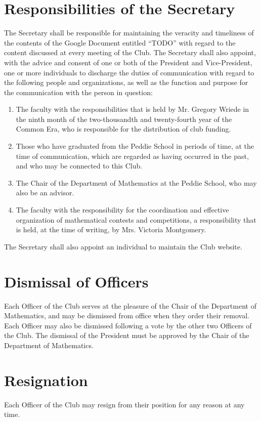 \documentclass[12pt, letterpaper]{article}
\begin{document}
\section{Responsibilities of the Secretary}
The Secretary shall be responsible for maintaining the veracity and timeliness of the contents of the Google Document entitled ``TODO'' with regard to the content discussed at every meeting of the Club. The Secretary shall also appoint, with the advice and consent of one or both of the President and Vice-President, one or more individuals to discharge the duties of communication with regard to the following people and organizations, as well as the function and purpose for the communication with the person in question:
\begin{enumerate}
	\item The faculty with the responsibilities that is held by Mr. Gregory Wriede in the ninth month of the two-thousandth and twenty-fourth year of the Common Era, who is responsible for the distribution of club funding.
	\item Those who have graduated from the Peddie School in periods of time, at the time of communication, which are regarded as having occurred in the past, and who may be connected to this Club.
	\item The Chair of the Department of Mathematics at the Peddie School, who may also be an advisor.
	\item The faculty with the responsibility for the coordination and effective organization of mathematical contests and competitions, a responsibility that is held, at the time of writing, by Mrs. Victoria Montgomery.
\end{enumerate}
The Secretary shall also appoint an individual to maintain the Club website.

\section{Dismissal of Officers}
Each Officer of the Club serves at the pleasure of the Chair of the Department of Mathematics, and may be dismissed from office when they order their removal. Each Officer may also be dismissed following a vote by the other two Officers of the Club. The dismissal of the President must be approved by the Chair of the Department of Mathematics. 

\section{Resignation}
Each Officer of the Club may resign from their position for any reason at any time.
\end{document}
